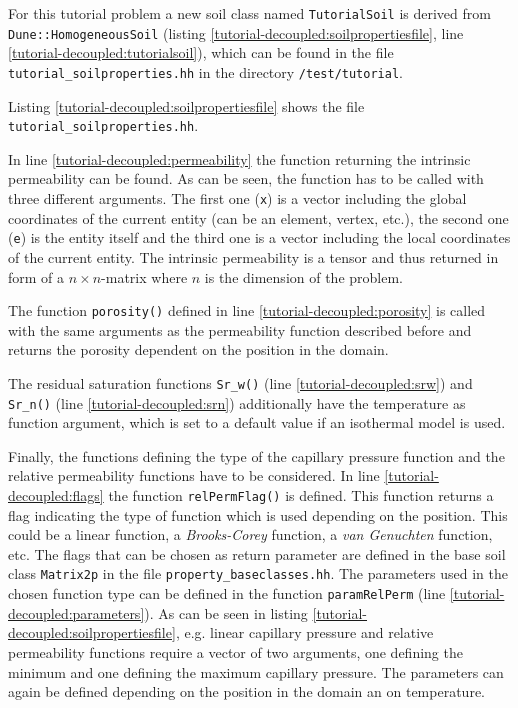 For this tutorial problem a new soil class named \texttt{TutorialSoil} is derived from \texttt{Dune::HomogeneousSoil} (listing \ref{tutorial-decoupled:soilpropertiesfile}, line \ref{tutorial-decoupled:tutorialsoil}), which can be found in the file \texttt{tutorial\_soilproperties.hh} in the directory \texttt{/test/tutorial}.

Listing \ref{tutorial-decoupled:soilpropertiesfile} shows the file \texttt{tutorial\_soilproperties.hh}.

\begin{lst}\label{tutorial-decoupled:soilpropertiesfile} \mbox{}

\end{lst}

In line \ref{tutorial-decoupled:permeability} the function returning the intrinsic permeability can be found. As can be seen, the function has to be called with three different arguments. The first one (\texttt{x}) is a vector including the global coordinates of the current entity (can be an element, vertex, etc.), the second one (\texttt{e}) is the entity itself and the third one is a vector including the local coordinates of the current entity. The intrinsic permeability is a tensor and thus returned in form of a $n \times n$-matrix where $n$ is the dimension of the problem.

The function \texttt{porosity()} defined in line \ref{tutorial-decoupled:porosity} is called with the same arguments as the permeability function described before and returns the porosity dependent on the position in the domain.

The residual saturation functions \texttt{Sr\_w()} (line \ref{tutorial-decoupled:srw}) and \texttt{Sr\_n()} (line \ref{tutorial-decoupled:srn}) additionally have the temperature as function argument, which is set to a default value if an isothermal model is used.

Finally, the functions defining the type of the capillary pressure function and the relative permeability functions have to be considered. In line \ref{tutorial-decoupled:flags} the function \texttt{relPermFlag()} is defined. This function returns a flag indicating the type of function which is used depending on the position. This could be a linear function, a \textit{Brooks-Corey} function, a \textit{van Genuchten} function, etc. The flags that can be chosen as return parameter are defined in the base soil class \texttt{Matrix2p} in the file \texttt{property\_baseclasses.hh}. The parameters used in the chosen function type can be defined in the function \texttt{paramRelPerm} (line \ref{tutorial-decoupled:parameters}). As can be seen in listing \ref{tutorial-decoupled:soilpropertiesfile}, e.g. linear capillary pressure and relative permeability functions require a vector of two arguments, one defining the minimum and one defining the maximum capillary pressure. The parameters can again be defined depending on the position in the domain an on temperature.

